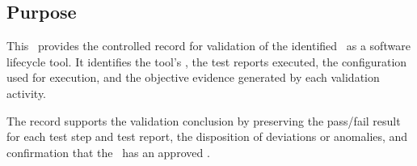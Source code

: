 \subsection{Purpose}
This \stdRptPkg\ provides the controlled record for validation of the identified
\stdCfgItem\ as a software lifecycle tool.  It identifies the tool's \stdIUR,
the test reports executed, the configuration used for execution, and the
objective evidence generated by each validation activity.

\tlcVspace

The record supports the validation conclusion by preserving the pass/fail result
for each test step and test report, the disposition of deviations or anomalies,
and confirmation that the \stdCfgItem\ has an approved \stdCfgID.
